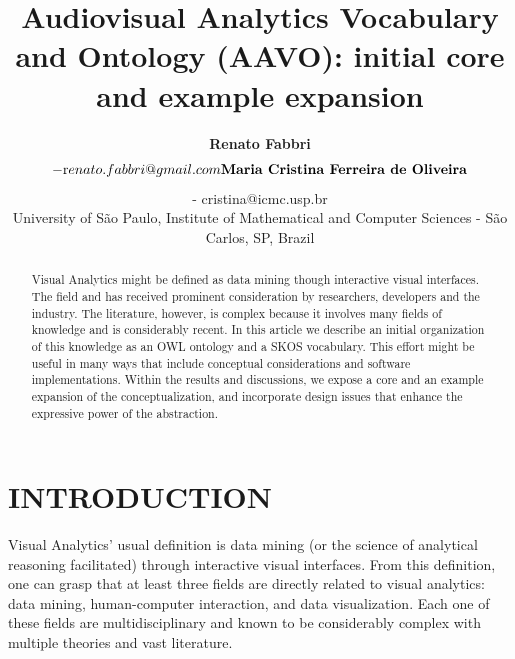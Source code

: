 \documentclass[12pt,fleqn]{article}
\title{Audiovisual Analytics Vocabulary and Ontology (AAVO): initial core and example expansion}
\author
    {\rm \begin{tabular}{l} 
    \textbf{Renato Fabbri}$$ - {\textnormal renato.fabbri@gmail.com}\\%
    \textbf{Maria Cristina Ferreira de Oliveira}$$ - {\textnormal cristina@icmc.usp.br}\\
    {\fontsize{11}{0}\selectfont University of São Paulo, Institute of Mathematical and Computer Sciences - São Carlos, SP, Brazil}\vspace*{-0.05cm} \\
  \end{tabular}}
\renewcommand{\headrulewidth}{0.0pt}
\begin{document}
\maketitle

\thispagestyle{firspagetstyle}

\renewcommand{\headrulewidth}{0.0pt}
\rhead{}

\begin{abstract}
Visual Analytics might be defined as data mining though interactive visual interfaces.
The field and has received prominent consideration by researchers, developers and the industry. 
The literature, however, is complex because it involves many fields of knowledge
and is considerably recent.
In this article we describe an initial organization of this knowledge as an OWL ontology
and a SKOS vocabulary.
This effort might be useful in many ways that include conceptual considerations and
software implementations.
Within the results and discussions, we expose a core and an example expansion
of the conceptualization, and incorporate design issues that enhance the
expressive power of the abstraction. 
\end{abstract}


\pagestyle{fancy}

\section{INTRODUCTION}\label{sec:intro}
Visual Analytics' usual definition is data mining (or the science of analytical reasoning facilitated)
through interactive visual interfaces.
From this definition, one can grasp that at least three fields are directly related to visual analytics:
data mining, human-computer interaction, and data visualization.
Each one of these fields are multidisciplinary and known to be considerably complex
with multiple theories and vast literature.
\end{document}
